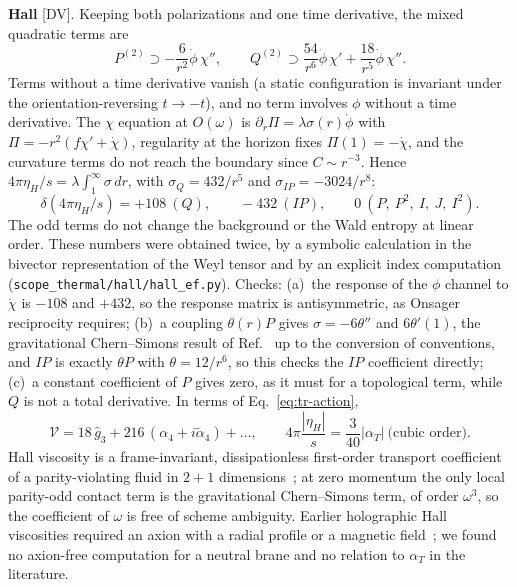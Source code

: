 \textbf{Hall} [DV]. Keeping both polarizations and one time derivative, the mixed quadratic terms are
\begin{equation}
P^{(2)}\supset-\frac6{r^2}\dot\phi\,\chi'',\qquad Q^{(2)}\supset\frac{54}{r^6}\dot\phi\,\chi'+\frac{18}{r^5}\dot\phi\,\chi''.
\end{equation}
Terms without a time derivative vanish (a static configuration is invariant under the orientation-reversing $t\to-t$), and no
term involves $\phi$ without a time derivative. The $\chi$ equation at $O(\omega)$ is $\partial_r\Pi=\lambda\sigma(r)\dot\phi$ with
$\Pi=-r^2(f\chi'+\dot\chi)$, regularity at the horizon fixes $\Pi(1)=-\dot\chi$, and the curvature terms do not reach the boundary
since $C\sim r^{-3}$. Hence $4\pi\eta_H/s=\lambda\int_1^\infty\sigma\,dr$, with
$\sigma_Q=432/r^5$ and $\sigma_{IP}=-3024/r^8$:
\begin{equation}
\delta(4\pi\eta_H/s)=+108\ (Q),\qquad -432\ (IP),\qquad 0\ (P,\ P^2,\ I,\ J,\ I^2).
\end{equation}
The odd terms do not change the background or the Wald entropy at linear order. These numbers were obtained twice, by a
symbolic calculation in the bivector representation of the Weyl tensor and by an explicit index computation
(\texttt{scope\_thermal/hall/hall\_ef.py}). Checks: (a)~the response of the $\phi$ channel to $\dot\chi$ is $-108$ and $+432$,
so the response matrix is antisymmetric, as Onsager reciprocity requires; (b)~a coupling $\theta(r)P$ gives $\sigma=-6\theta''$
and $6\theta'(1)$, the gravitational Chern--Simons result of Ref.~\cite{Saremi:2011ab} up to the conversion of conventions, and
$IP$ is exactly $\theta P$ with $\theta=12/r^6$, so this checks the $IP$ coefficient directly; (c)~a constant coefficient of
$P$ gives zero, as it must for a topological term, while $Q$ is not a total derivative. In terms of Eq.~\eqref{eq:tr-action},
\begin{equation}
\mathcal V=18\,\hat g_3+216\,(\alpha_4+i\tilde\alpha_4)+\dots,\qquad 4\pi\frac{|\eta_H|}s=\frac3{40}|\alpha_T|\ \text{(cubic order)}.
\label{eq:tr-V}
\end{equation}
Hall viscosity is a frame-invariant, dissipationless first-order transport coefficient of a parity-violating fluid in
$2+1$ dimensions~\cite{Jensen:2011xb}; at zero momentum the only local parity-odd contact term is the gravitational Chern--Simons
term, of order $\omega^3$, so the coefficient of $\omega$ is free of scheme ambiguity. Earlier holographic Hall viscosities
required an axion with a radial profile or a magnetic field~\cite{Saremi:2011ab,Hoyos:2019pyz}; we found no axion-free
computation for a neutral brane and no relation to $\alpha_T$ in the literature.


